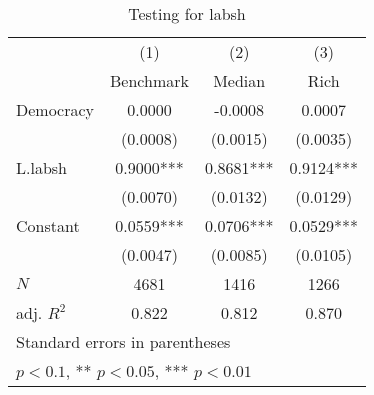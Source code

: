 \begin{table}[htbp]\centering
\def\sym#1{\ifmmode^{#1}\else\(^{#1}\)\fi}
\caption{Testing for labsh \label{tab:regression9}}
\begin{tabular}{l*{3}{c}}
\hline\hline
            &\multicolumn{1}{c}{(1)}&\multicolumn{1}{c}{(2)}&\multicolumn{1}{c}{(3)}\\
            &\multicolumn{1}{c}{Benchmark}&\multicolumn{1}{c}{Median}&\multicolumn{1}{c}{Rich}\\
\hline
Democracy   &      0.0000   &     -0.0008   &      0.0007   \\
            &    (0.0008)   &    (0.0015)   &    (0.0035)   \\
[1em]
L.labsh     &      0.9000***&      0.8681***&      0.9124***\\
            &    (0.0070)   &    (0.0132)   &    (0.0129)   \\
[1em]
Constant    &      0.0559***&      0.0706***&      0.0529***\\
            &    (0.0047)   &    (0.0085)   &    (0.0105)   \\
\hline
\(N\)       &        4681   &        1416   &        1266   \\
adj. \(R^{2}\)&       0.822   &       0.812   &       0.870   \\
\hline\hline
\multicolumn{4}{l}{\footnotesize Standard errors in parentheses}\\
\multicolumn{4}{l}{\footnotesize * \(p<0.1\), ** \(p<0.05\), *** \(p<0.01\)}\\
\end{tabular}
\end{table}
